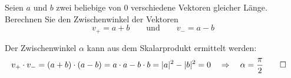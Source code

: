 Seien $a$ und $b$ zwei beliebige von $0$ verschiedene Vektoren gleicher Länge.
Berechnen Sie den Zwischenwinkel der Vektoren
\[
v_+=a+b
\qquad\text{und}\qquad
v_-=a -b
\]


\begin{loesung}
Der Zwischenwinkel  $\alpha$ kann aus dem Skalarprodukt ermittelt werden:
\begin{align*}
v_+\cdot v_-
&=
(a+b) \cdot (a-b)
=
a\cdot a-b\cdot b=|a|^2-|b|^2=0\quad\Rightarrow\quad \alpha=\frac{\pi}2
\qedhere
\end{align*}
\end{loesung}

